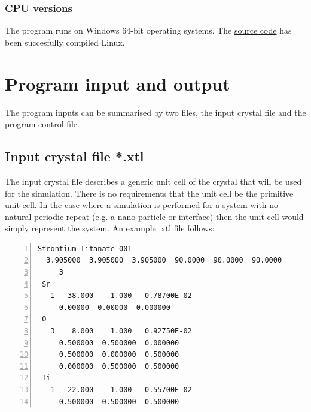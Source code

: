 \documentclass[12pt,a4paper]{article}
\begin{document}
\subsubsection{CPU versions}
The program runs on Windows 64-bit operating systems. The \href{https://github.com/HamishGBrown/MuSTEM}{source code} has been succesfully compiled Linux. 







\section{Program input and output}

The program inputs can be summarised by two files, the input crystal file and the program control file.

\subsection{Input crystal file *.xtl}
\label{xtl_input}

The input crystal file describes a generic unit cell of the crystal that will be used for the simulation.
There is no requirements that the unit cell be the primitive unit cell.
In the case where a simulation is performed for a system with no natural periodic repeat (e.g. a nano-particle or interface) then the unit cell would simply represent the system.
An example .xtl file follows: 
%
\begin{lstlisting}[language={},numbers=left,numberstyle=\tiny]
 Strontium Titanate 001
  3.905000  3.905000  3.905000  90.0000  90.0000  90.0000
     3
 Sr
   1   38.000    1.000   0.78700E-02
     0.00000  0.00000  0.000000
 O 
   3    8.000    1.000   0.92750E-02
     0.500000  0.500000  0.000000
     0.500000  0.000000  0.500000
     0.000000  0.500000  0.500000
 Ti
   1   22.000    1.000   0.55700E-02
     0.500000  0.500000  0.500000
\end{lstlisting}
\end{document}

